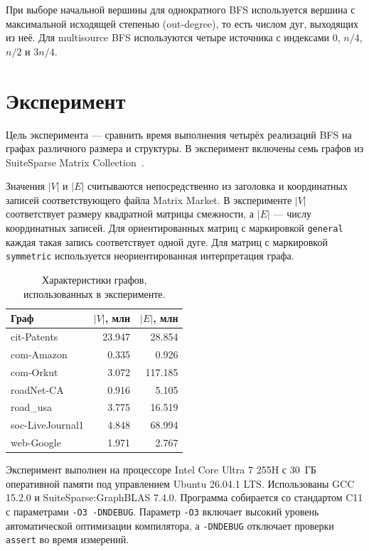 \documentclass[a4paper,10pt]{article}
\begin{document}
При выборе начальной вершины для однократного BFS используется вершина
с максимальной исходящей степенью (out-degree), то есть числом дуг,
выходящих из неё. Для multisource BFS используются четыре источника
с индексами $0$, $n/4$, $n/2$ и $3n/4$.

\section{Эксперимент}

Цель эксперимента --- сравнить время выполнения четырёх реализаций BFS
на графах различного размера и структуры. В эксперимент включены семь
графов из SuiteSparse Matrix Collection~\cite{ssmc}.

Значения $|V|$ и $|E|$ считываются непосредственно из заголовка и
координатных записей соответствующего файла Matrix Market. В
эксперименте $|V|$ соответствует размеру квадратной матрицы смежности,
а $|E|$ --- числу координатных записей. Для ориентированных матриц с
маркировкой \texttt{general} каждая такая запись соответствует одной
дуге. Для матриц с маркировкой \texttt{symmetric} используется
неориентированная интерпретация графа.

\begin{table}[H]
\centering
\scriptsize
\setlength{\tabcolsep}{3.5pt}
\begin{tabular}{lrr}
\toprule
Граф & $|V|$, млн & $|E|$, млн \\
\midrule
cit-Patents & 23.947 & 28.854 \\
com-Amazon & 0.335 & 0.926 \\
com-Orkut & 3.072 & 117.185 \\
roadNet-CA & 0.916 & 5.105 \\
road\_usa & 3.775 & 16.519 \\
soc-LiveJournal1 & 4.848 & 68.994 \\
web-Google & 1.971 & 2.767 \\
\bottomrule
\end{tabular}
\caption{Характеристики графов, использованных в эксперименте.}
\label{tab:graphs}
\end{table}

Эксперимент выполнен на процессоре Intel Core Ultra 7 255H с 30~ГБ
оперативной памяти под управлением Ubuntu 26.04.1 LTS. Использованы
GCC 15.2.0 и SuiteSparse:GraphBLAS 7.4.0. Программа собирается со
стандартом C11 с параметрами \texttt{-O3 -DNDEBUG}. Параметр
\texttt{-O3} включает высокий уровень автоматической оптимизации
компилятора, а \texttt{-DNDEBUG} отключает проверки \texttt{assert}
во время измерений.
\end{document}
